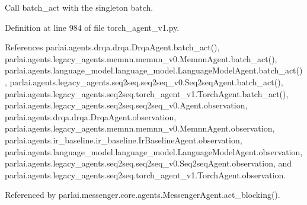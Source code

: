 \begin{DoxyVerb}Call batch_act with the singleton batch.\end{DoxyVerb}
 

Definition at line 984 of file torch\+\_\+agent\+\_\+v1.\+py.



References parlai.\+agents.\+drqa.\+drqa.\+Drqa\+Agent.\+batch\+\_\+act(), parlai.\+agents.\+legacy\+\_\+agents.\+memnn.\+memnn\+\_\+v0.\+Memnn\+Agent.\+batch\+\_\+act(), parlai.\+agents.\+language\+\_\+model.\+language\+\_\+model.\+Language\+Model\+Agent.\+batch\+\_\+act(), parlai.\+agents.\+legacy\+\_\+agents.\+seq2seq.\+seq2seq\+\_\+v0.\+Seq2seq\+Agent.\+batch\+\_\+act(), parlai.\+agents.\+legacy\+\_\+agents.\+seq2seq.\+torch\+\_\+agent\+\_\+v1.\+Torch\+Agent.\+batch\+\_\+act(), parlai.\+agents.\+legacy\+\_\+agents.\+seq2seq.\+seq2seq\+\_\+v0.\+Agent.\+observation, parlai.\+agents.\+drqa.\+drqa.\+Drqa\+Agent.\+observation, parlai.\+agents.\+legacy\+\_\+agents.\+memnn.\+memnn\+\_\+v0.\+Memnn\+Agent.\+observation, parlai.\+agents.\+ir\+\_\+baseline.\+ir\+\_\+baseline.\+Ir\+Baseline\+Agent.\+observation, parlai.\+agents.\+language\+\_\+model.\+language\+\_\+model.\+Language\+Model\+Agent.\+observation, parlai.\+agents.\+legacy\+\_\+agents.\+seq2seq.\+seq2seq\+\_\+v0.\+Seq2seq\+Agent.\+observation, and parlai.\+agents.\+legacy\+\_\+agents.\+seq2seq.\+torch\+\_\+agent\+\_\+v1.\+Torch\+Agent.\+observation.



Referenced by parlai.\+messenger.\+core.\+agents.\+Messenger\+Agent.\+act\+\_\+blocking().

